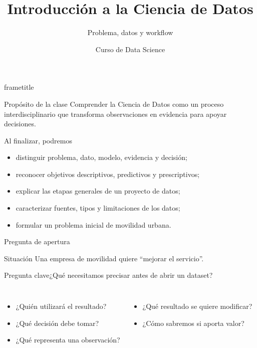 \documentclass[aspectratio=169,11pt]{beamer}
\title[Data Science · Clase 1]{Introducción a la Ciencia de Datos}
\subtitle{Problema, datos y workflow}
\author{Curso de Data Science}
\institute{Semana 1 · Clase 1}
\date{}
\newcommand{\pregunta}[1]{\begin{block}{Pregunta clave}#1\end{block}}
\begin{document}
\begin{frame}[plain]
  \begin{beamercolorbox}[wd=\paperwidth,ht=\paperheight,sep=2em]{frametitle}
    \vfill
    {\Huge\inserttitle\par}
    \vspace{0.5em}
    {\Large\insertsubtitle\par}
    \vspace{2em}
    {\color{white}\large\insertauthor\par}
    {\color{white}\insertinstitute\par}
    \vfill
  \end{beamercolorbox}
\end{frame}

\begin{frame}{Propósito de la clase}
  Comprender la Ciencia de Datos como un proceso interdisciplinario que transforma observaciones en evidencia para apoyar decisiones.
  \vspace{0.6em}
  \begin{block}{Al finalizar, podremos}
    \begin{itemize}
      \item distinguir problema, dato, modelo, evidencia y decisión;
      \item reconocer objetivos descriptivos, predictivos y prescriptivos;
      \item explicar las etapas generales de un proyecto de datos;
      \item caracterizar fuentes, tipos y limitaciones de los datos;
      \item formular un problema inicial de movilidad urbana.
    \end{itemize}
  \end{block}
\end{frame}

\begin{frame}{Pregunta de apertura}
  \begin{block}{Situación}
    Una empresa de movilidad quiere ``mejorar el servicio''.
  \end{block}
  \pregunta{¿Qué necesitamos precisar antes de abrir un dataset?}
  \begin{columns}[T]
      \begin{itemize}
        \item ¿Quién utilizará el resultado?
        \item ¿Qué decisión debe tomar?
        \item ¿Qué representa una observación?
      \end{itemize}
      \begin{itemize}
        \item ¿Qué resultado se quiere modificar?
        \item ¿Cómo sabremos si aporta valor?
      \end{itemize}
  \end{columns}
\end{frame}
\end{document}
